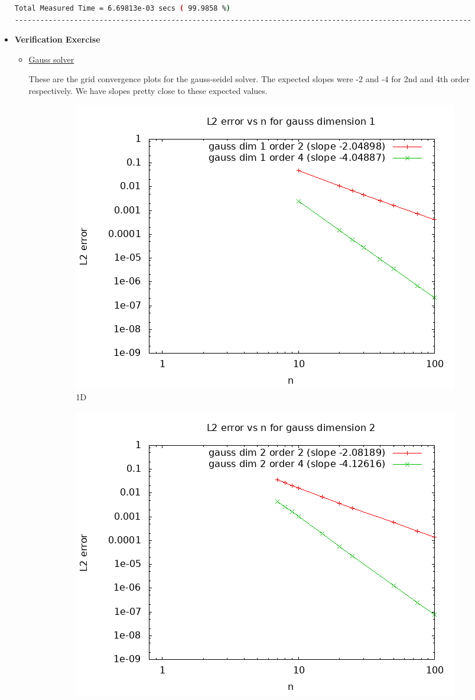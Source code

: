 \documentclass[12 pt, final]{article}
\begin{document}
\begin{itemize}
\begin{lstlisting}[language = bash, basicstyle=\tiny]
                 Total Measured Time = 6.69813e-03 secs ( 99.9858 %)
------------------------------------------------------------------------------------------------------------
\end{lstlisting}
    \item \textbf{Verification Exercise}
    \begin{itemize}
        \item \underline{Gauss solver}
        
        These are the grid convergence plots for the gauss-seidel solver. The expected slopes were -2 and -4 for 2nd and 4th order respectively. We have slopes pretty close to these expected values.

        \begin{figure}[H]
        \centering
        \begin{subfigure}{.5\textwidth}
          \centering
          \includegraphics[width=.99\linewidth]{figures/convergence_gauss_dim1.png}
          \caption{1D}
          \label{fig:sub1}
        \end{subfigure}%
        \begin{subfigure}{.5\textwidth}
          \centering
          \includegraphics[width=.99\linewidth]{figures/convergence_gauss_dim2.png}

\end{subfigure}
\end{figure}
\end{itemize}
\end{itemize}
\end{document}

